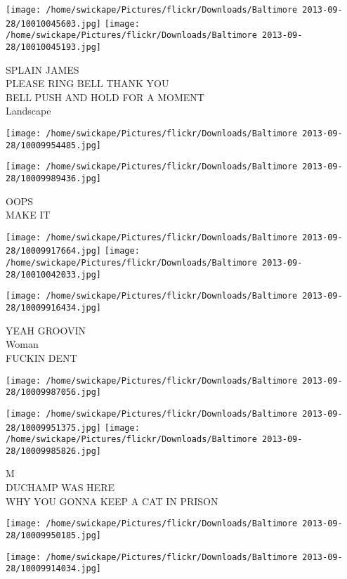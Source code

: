 \documentclass[10pt,letterpaper]{article}
\begin{document}
\texttt{[image: /home/swickape/Pictures/flickr/Downloads/Baltimore 2013-09-28/10010045603.jpg]}
\texttt{[image: /home/swickape/Pictures/flickr/Downloads/Baltimore 2013-09-28/10010045193.jpg]}

SPLAIN JAMES\\
PLEASE RING BELL THANK YOU\\
BELL PUSH AND HOLD FOR A MOMENT\\
Landscape\\
\pagebreak

\texttt{[image: /home/swickape/Pictures/flickr/Downloads/Baltimore 2013-09-28/10009954485.jpg]}

\vspace{0.25in}
\texttt{[image: /home/swickape/Pictures/flickr/Downloads/Baltimore 2013-09-28/10009989436.jpg]}

OOPS\\
MAKE IT\\
\pagebreak

\texttt{[image: /home/swickape/Pictures/flickr/Downloads/Baltimore 2013-09-28/10009917664.jpg]}
\texttt{[image: /home/swickape/Pictures/flickr/Downloads/Baltimore 2013-09-28/10010042033.jpg]}

\texttt{[image: /home/swickape/Pictures/flickr/Downloads/Baltimore 2013-09-28/10009916434.jpg]}

YEAH GROOVIN\\
Woman\\
FUCKIN DENT\\
\pagebreak

\texttt{[image: /home/swickape/Pictures/flickr/Downloads/Baltimore 2013-09-28/10009987056.jpg]}

\vspace{0.25in}
\texttt{[image: /home/swickape/Pictures/flickr/Downloads/Baltimore 2013-09-28/10009951375.jpg]}
\texttt{[image: /home/swickape/Pictures/flickr/Downloads/Baltimore 2013-09-28/10009985826.jpg]}

M\\
DUCHAMP WAS HERE\\
WHY YOU GONNA KEEP A CAT IN PRISON\\
\pagebreak

\texttt{[image: /home/swickape/Pictures/flickr/Downloads/Baltimore 2013-09-28/10009950185.jpg]}

\vspace{0.25in}
\texttt{[image: /home/swickape/Pictures/flickr/Downloads/Baltimore 2013-09-28/10009914034.jpg]}
\end{document}
